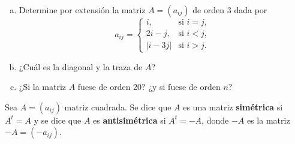 \begin{ejem}
    \begin{enumerate}[(a)]
        \item Determine por extensi\'on la matriz $A=(a_{ij})$ de orden 3 dada por
        \[a_{ij}=\begin{cases}
			i, & \text{si $i=j$,}\\
            2i-j, & \text{si $i<j$},\\
            |i-3j| & \text{si $i>j$}.
		 \end{cases}\]
		 \item ¿Cuál es la diagonal y la traza de $A$?
        \item ¿Si la matriz $A$ fuese de orden 20? ¿y si fuese de orden $n$?
    \end{enumerate}
\end{ejem}

\begin{defin}
Sea $A = (a_{i j})$ matriz cuadrada. Se dice que $A$ es una matriz \textbf{simétrica} si
$A^t = A$ y se dice que $A$ es \textbf{antisimétrica} si $A^t = -A$, donde $-A$ es la matriz
$-A = (-a_{i j})$.
\end{defin}

